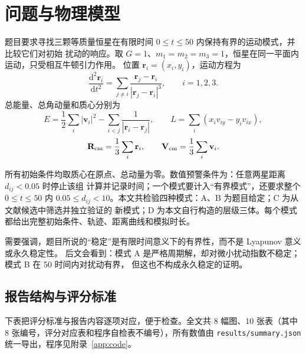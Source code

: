 \documentclass[UTF8,fontset=windows,11pt,a4paper]{ctexart}
\newcommand{\vect}[1]{\mathbf{#1}}
\newcommand{\dd}{\mathrm{d}}
\begin{document}
{\small\tableofcontents}
\newpage
{}

\section{问题与物理模型}\label{sec:model}

题目要求寻找三颗等质量恒星在有限时间 $0\le t\le 50$ 内保持有界的运动模式，并比较它们对初始
扰动的响应。取 $G=1$、$m_1=m_2=m_3=1$，恒星在同一平面内运动，只受相互牛顿引力作用。
位置 $\vect r_i=(x_i,y_i)$，运动方程为
\begin{equation}\label{eq:eom}
\frac{\dd^2\vect r_i}{\dd t^2}
=\sum_{j\ne i}\frac{\vect r_j-\vect r_i}{|\vect r_j-\vect r_i|^3},
\qquad i=1,2,3.
\end{equation}
总能量、总角动量和质心分别为
\begin{equation}\label{eq:energy}
E=\frac12\sum_i|\vect v_i|^2-\sum_{i<j}\frac{1}{|\vect r_i-\vect r_j|},
\qquad
L=\sum_i\left(x_i v_{iy}-y_i v_{ix}\right),
\end{equation}
\begin{equation}\label{eq:com}
\vect R_{\rm cm}=\frac13\sum_i\vect r_i,
\qquad
\vect V_{\rm cm}=\frac13\sum_i\vect v_i.
\end{equation}

所有初始条件均取质心在原点、总动量为零。数值预警条件为：任意两星距离 $d_{ij}<0.05$ 时停止该组
计算并记录时间；一个模式要计入“有界模式”，还要求整个 $0\le t\le 50$ 内
$0.05\le d_{ij}<10$。本文共检验四种模式：A、B 为题目给定；C 为从文献候选中筛选并独立验证的
新模式；D 为本文自行构造的层级三体。每个模式都给出完整初始条件、轨迹、距离曲线和模拟时长。

需要强调，题目所说的“稳定”是有限时间意义下的有界性，而不是 Lyapunov 意义或永久稳定性。
后文会看到：模式 A 是严格周期解，却对微小扰动指数不稳定；模式 B 在 50 时间内对扰动有界，
但这也不构成永久稳定的证明。

\subsection{报告结构与评分标准}
下表把评分标准与报告内容逐项对应，便于检查。全文共 8 幅图、10 张表（其中 8 张编号，评分对应表和程序自检表不编号），所有数值由 \texttt{results/summary.json} 统一导出，程序见附录~\ref{app:code}。
\end{document}
